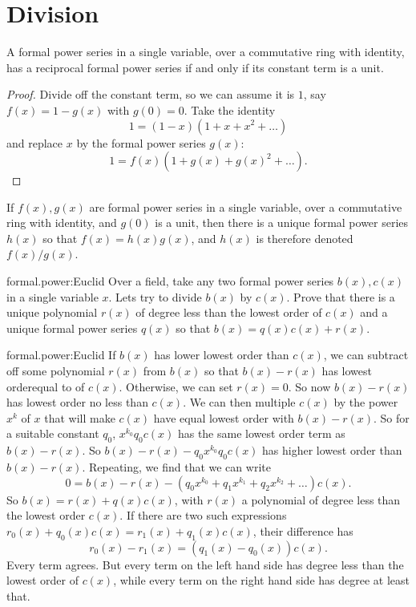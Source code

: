 \section{Division}
\begin{theorem}
A formal power series in a single variable, over a commutative ring with identity, has a reciprocal formal power series if and only if its constant term is a unit.
\end{theorem}
\begin{proof}
Divide off the constant term, so we can assume it is \(1\), say \(f(x)=1-g(x)\) with \(g(0)=0\).
Take the identity
\[
1=(1-x)(1+x+x^2+\dots)
\]
and replace \(x\) by the formal power series \(g(x)\):
\[
1=f(x)(1+g(x)+g(x)^2+\dots).
\]
\end{proof}
\begin{corollary}
If \(f(x),g(x)\) are formal power series in a single variable, over a commutative ring with identity, and \(g(0)\) is a unit, then there is a unique formal power series \(h(x)\) so that \(f(x)=h(x)g(x)\), and \(h(x)\) is therefore denoted \(f(x)/g(x)\).
\end{corollary}
\begin{problem}{formal.power:Euclid}
Over a field, take any two formal power series \(b(x),c(x)\) in a single variable \(x\).
Lets try to divide \(b(x)\) by \(c(x)\).
Prove that there is a unique polynomial \(r(x)\) of degree less than the lowest order of \(c(x)\) and  a unique formal power series \(q(x)\) so that \(b(x)=q(x)c(x)+r(x)\).
\end{problem}
\begin{answer}{formal.power:Euclid}
If \(b(x)\) has lower lowest order than \(c(x)\), we can subtract off some polynomial \(r(x)\) from \(b(x)\) so that \(b(x)-r(x)\) has lowest orderequal to of \(c(x)\).
Otherwise, we can set \(r(x)=0\).
So now \(b(x)-r(x)\) has lowest order no less than \(c(x)\).
We can then multiple \(c(x)\) by the power \(x^k\) of \(x\) that will make \(c(x)\) have equal lowest order with \(b(x)-r(x)\).
So for a suitable constant \(q_0\), \(x^{k_0}q_0c(x)\) has the same lowest order term as \(b(x)-r(x)\).
So \(b(x)-r(x)-q_0x^{k_0}q_0c(x)\) has higher lowest order than \(b(x)-r(x)\).
Repeating, we find that we can write
\[
0=b(x)-r(x)-(q_0x^{k_0}+q_1x^{k_1}+q_2x^{k_2}+\dots)c(x).
\]
So \(b(x)=r(x)+q(x)c(x)\), with \(r(x)\) a polynomial of degree less than the lowest order \(c(x)\).
If there are two such expressions \(r_0(x)+q_0(x)c(x)=r_1(x)+q_1(x)c(x)\), their difference has
\[
r_0(x)-r_1(x)=(q_1(x)-q_0(x))c(x).
\]
Every term agrees.
But every term on the left hand side has degree less than the lowest order of \(c(x)\), while every term on the right hand side has degree at least that.
\end{answer}

